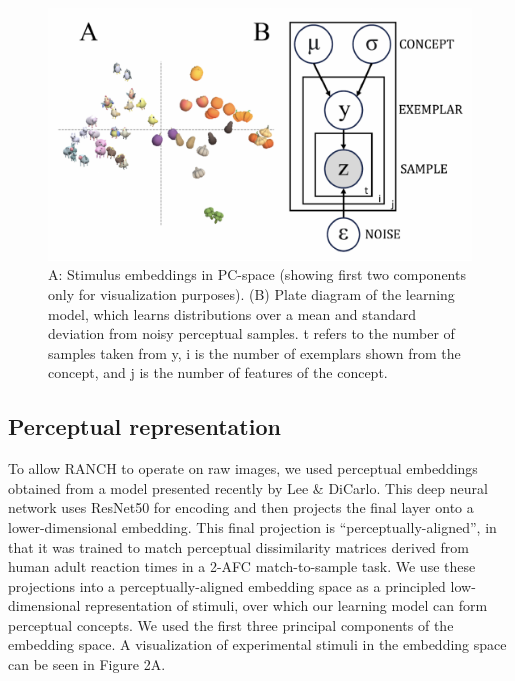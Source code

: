 \documentclass[10pt, letterpaper]{article}
\newenvironment{CodeChunk}{}{}
\begin{document}
\begin{CodeChunk}
\begin{figure}[H]

{\centering \includegraphics{figs/model_fig-1} 

}

\caption[A]{A: Stimulus embeddings in PC-space (showing first two components only for visualization purposes). (B) Plate diagram of the learning model, which learns distributions over a mean and standard deviation from noisy perceptual samples. t refers to the number of samples taken from y, i is the number of exemplars shown from the concept, and j is the number of features of the concept.}\label{fig:model_fig}
\end{figure}
\end{CodeChunk}

\hypertarget{perceptual-representation}{%
\subsection{Perceptual representation}\label{perceptual-representation}}

To allow RANCH to operate on raw images, we used perceptual embeddings
obtained from a model presented recently by Lee \& DiCarlo. This deep
neural network uses ResNet50 for encoding and then projects the final
layer onto a lower-dimensional embedding. This final projection is
``perceptually-aligned'', in that it was trained to match perceptual
dissimilarity matrices derived from human adult reaction times in a
2-AFC match-to-sample task. We use these projections into a
perceptually-aligned embedding space as a principled low-dimensional
representation of stimuli, over which our learning model can form
perceptual concepts. We used the first three principal components of the
embedding space. A visualization of experimental stimuli in the
embedding space can be seen in Figure 2A.
\end{document}
